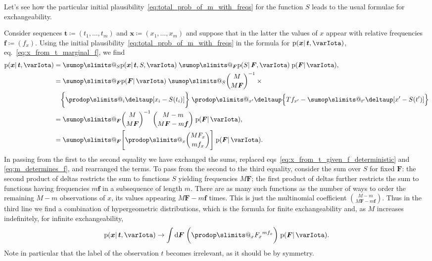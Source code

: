 \documentclass[\ifafour a4paper,12pt,\else a5paper,10pt,\fi%
onecolumn,oneside,article,%
british%
]{memoir}
\makeatletter
\theoremstyle{remark}
\theoremstyle{innote}
\def\sum{\DOTSI\sumop\slimits@}
\def\prod{\DOTSI\prodop\slimits@}
\newcommand*{\delt}{\deltaup}%
\newcommand*{\di}{\mathrm{d}}%
\newcommand*{\defd}{\coloneqq}
\newcommand*{\pf}{\mathrm{p}}%
\renewcommand*{\|}{\mathpunct{|}}
\newcommand*{\eqn}{eq.}%
\newcommand*{\eqns}{eqs}%
\newcommand*{\yI}{\varIota}
\newcommand*{\yx}{\bm{x}}
\newcommand*{\yt}{\bm{t}}
\newcommand*{\yF}{\bm{F}}
\newcommand*{\yf}{\bm{f}}
\makeatother
\begin{document}
Let's see how the particular initial
plausibility~\eqref{eq:total_prob_of_m_with_freqs} for the function $S$
leads to the usual formulae for exchangeability.

Consider sequences $\yt\defd (t_1,\dotsc,t_{m})$ and
$\yx\defd (x_1,\dotsc,x_{m})$ and suppose that in the latter the values of
$x$ appear with relative frequencies $\yf\defd (f_{x})$. Using the initial
plausibility~\eqref{eq:total_prob_of_m_with_freqs} in the formula for
$\pf(\yx \|\yt,\yI)$, \eqn~\eqref{eq:x_from_t_marginal_f}, we find
\begin{equation}
  \label{eq:expand_pxt_with_freqs}
  \begin{split}
  \pf(\yx \|\yt, \yI) &= \sum_S \pf(\yx \| \yt, S, \yI)\;
  \sum_{\yF} \pf(S \| \yF, \yI)\; \pf(\yF \| \yI),
  \\
&\!\begin{multlined}[t][0.85\linewidth]
= \sum_{\yF} \pf(\yF \| \yI)\;\sum_S
\binom{M}{M\yF}^{-1}\times{}\\
\biggl\{\prod_i\delt[x_i - S(t_i)]\biggr\}
\;\prod_{x'} \delt\Bigl\{ Tf_{x'}- \sum_{t'} \delt[x'-S(t')]\Bigr\}
\end{multlined}
\\
&= \sum_{\yF}
\binom{M}{M\yF}^{-1}\;
\binom{M-m}{M\yF-m\yf}\;
\pf(\yF \| \yI),
\\
&= \sum_{\yF}
\Biggr[\prod_x\binom{M F_{x}}{m f_{x}}\Biggl]\;\pf(\yF \| \yI).
\end{split}
\end{equation}
In passing from the first to the second equality we have exchanged the
sums, replaced \eqns~\eqref{eq:x_from_t_given_f_deterministic} and
\eqref{eq:m_determines_f}, and rearranged the terms. To pass from the
second to the third equality, consider the sum over $S$ for fixed $\yF$:
the second product of deltas restricts the sum to functions $S$ yielding
frequencies $M \yF$; the first product of deltas further restricts the sum
to functions having frequencies $m \yf$ in a subsequence of length $m$.
There are as many such functions as the number of ways to order the
remaining $M-m$ observations of $x$, its values appearing $M\yF - m\yf$
times. This is just the multinomial coefficient $\binom{M-m}{M\yF-m\yf}$.
Thus in the third line we find a combination of hypergeometric
distributions, which is the formula for finite exchangeability and, as $M$
increases indefinitely, for infinite exchangeability,
\begin{equation}
  \label{eq:infinite_exch}
  \begin{split}
  \pf(\yx \|\yt, \yI) \to \int\di\yF\;
\biggl(\prod_{x} {F_{x}}^{m f_{x}}\biggr)  \;\pf(\yF \| \yI).
\end{split}
\end{equation}
Note in particular that the label of the observation $t$ becomes
irrelevant, as it should be by symmetry.
\end{document}
